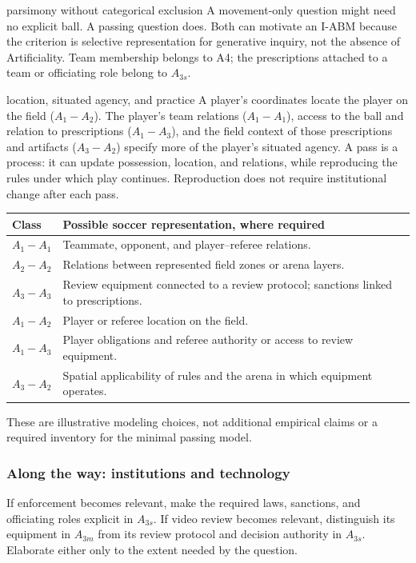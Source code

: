 \documentclass[11pt,a4paper]{article}
\begin{document}
\begin{soccer}{parsimony without categorical exclusion}
A movement-only question might need no explicit ball. A passing question does. Both can motivate an I-ABM because the criterion is selective representation for generative inquiry, not the absence of Artificiality. Team membership belongs to A4; the prescriptions attached to a team or officiating role belong to $A_{3s}$.
\end{soccer}

\begin{soccer}{location, situated agency, and practice}
A player's coordinates locate the player on the field ($A_1-A_2$). The player's team relations ($A_1-A_1$), access to the ball and relation to prescriptions ($A_1-A_3$), and the field context of those prescriptions and artifacts ($A_3-A_2$) specify more of the player's situated agency. A pass is a process: it can update possession, location, and relations, while reproducing the rules under which play continues. Reproduction does not require institutional change after each pass.
\end{soccer}

\noindent\begin{tabularx}{\linewidth}{@{}p{2cm}Y@{}}
\toprule
\textbf{Class} & \textbf{Possible soccer representation, where required}\\\midrule
$A_1-A_1$ & Teammate, opponent, and player--referee relations.\\
$A_2-A_2$ & Relations between represented field zones or arena layers.\\
$A_3-A_3$ & Review equipment connected to a review protocol; sanctions linked to prescriptions.\\
$A_1-A_2$ & Player or referee location on the field.\\
$A_1-A_3$ & Player obligations and referee authority or access to review equipment.\\
$A_3-A_2$ & Spatial applicability of rules and the arena in which equipment operates.\\\bottomrule
\end{tabularx}
These are illustrative modeling choices, not additional empirical claims or a required inventory for the minimal passing model.

\subsubsection{Along the way: institutions and technology}
If enforcement becomes relevant, make the required laws, sanctions, and officiating roles explicit in $A_{3s}$. If video review becomes relevant, distinguish its equipment in $A_{3m}$ from its review protocol and decision authority in $A_{3s}$. Elaborate either only to the extent needed by the question.
\end{document}

